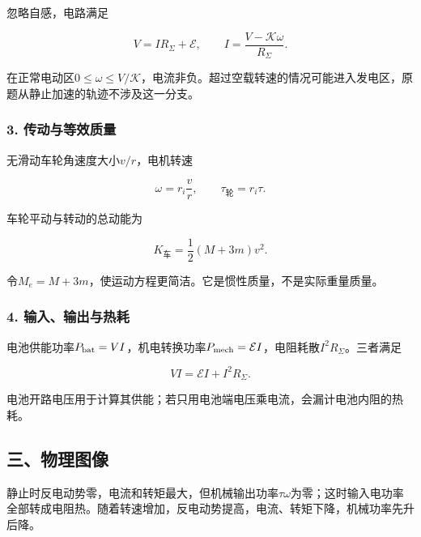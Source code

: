 \documentclass[12pt,a4paper,fontset=fandol]{ctexart}
\begin{document}
忽略自感，电路满足

\[
V=IR_\Sigma+\mathcal E,
\qquad I=\frac{V-\mathcal K\omega}{R_\Sigma}.
\]

在正常电动区\(0\leq\omega\leq V/\mathcal K\)，电流非负。超过空载转速的情况可能进入发电区，原题从静止加速的轨迹不涉及这一分支。

\subsubsection{3.
传动与等效质量}\label{ux4f20ux52a8ux4e0eux7b49ux6548ux8d28ux91cf}

无滑动车轮角速度大小\(v/r\)，电机转速

\[
\omega=r_i\frac vr,\qquad
\tau_{\text{轮}}=r_i\tau.
\]

车轮平动与转动的总动能为

\[
K_{\text{车}}=\frac12(M+3m)v^2.
\]

令\(M_e=M+3m\)，使运动方程更简洁。它是惯性质量，不是实际重量质量。

\subsubsection{4.
输入、输出与热耗}\label{ux8f93ux5165ux8f93ux51faux4e0eux70edux8017}

电池供能功率\(P_{\rm bat}=VI\)，机电转换功率\(P_{\rm mech}=\mathcal EI\)，电阻耗散\(I^2R_\Sigma\)。三者满足

\[
VI=\mathcal EI+I^2R_\Sigma.
\]

电池开路电压用于计算其供能；若只用电池端电压乘电流，会漏计电池内阻的热耗。

\subsection{三、物理图像}\label{ux4e09ux7269ux7406ux56feux50cf-7}

静止时反电动势零，电流和转矩最大，但机械输出功率\(\tau\omega\)为零；这时输入电功率全部转成电阻热。随着转速增加，反电动势提高，电流、转矩下降，机械功率先升后降。

\begin{center}
\begin{minipage}{\linewidth}
\centering\begingroup{}
\ifdim\wd\diagrambox>.88\linewidth
\sbox{\diagrambox}{\resizebox{.88\linewidth}{!}{\usebox{\diagrambox}}}\fi
\ifdim\ht\diagrambox>.38\textheight
\resizebox{!}{.38\textheight}{\usebox{\diagrambox}}
\else\usebox{\diagrambox}\fi
\par{}\endgroup\end{minipage}\end{center}
\end{document}

